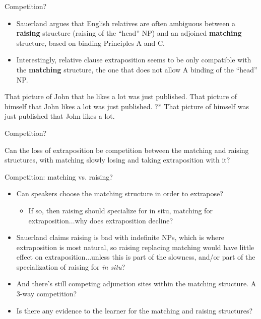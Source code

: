 \documentclass[hyperref={pdfpagelabels=false}]{beamer}
\begin{document}
\begin{frame}{Competition? \citet{sauerland2003}}
 \begin{itemize}
	\item Sauerland argues that English relatives are often ambiguous between a \textbf{raising} structure (raising of the ``head'' NP) and an adjoined \textbf{matching} structure, based on binding Principles A and C.
	\item Interestingly, relative clause extraposition seems to be only compatible with the \textbf{matching} structure, the one that does not allow A binding of the ``head'' NP.
\end{itemize}

\begin{exe}
	\ex That picture of John that he likes a lot was just published.
	\ex That picture of himself that John likes a lot was just published.
	\ex ?* That picture of himself was just published that John likes a lot.
\end{exe}
\end{frame}

\begin{frame}{Competition? \citet{sauerland2003}}
 
 Can the loss of extraposition be competition between the matching and raising structures, with matching slowly losing and taking extraposition with it?\\

\end{frame}



\begin{frame}{Competition: matching vs. raising? }

 \begin{itemize}
	\item Can speakers choose the matching structure in order to extrapose? 
		\begin{itemize}
			\item If so, then raising should specialize for in situ, matching for extraposition...why does extraposition decline?
		\end{itemize}
	\item Sauerland claims raising is bad with indefinite NPs, which is where extraposition is most natural, so raising replacing matching would have little effect on extraposition...unless this is part of the slowness, and/or part of the specialization of raising for \textsl{in situ}?
	\item And there's still competing adjunction sites within the matching structure. A 3-way competition?
	\item Is there any evidence to the learner for the matching and raising structures?
\end{itemize}


\end{frame}
\end{document}
